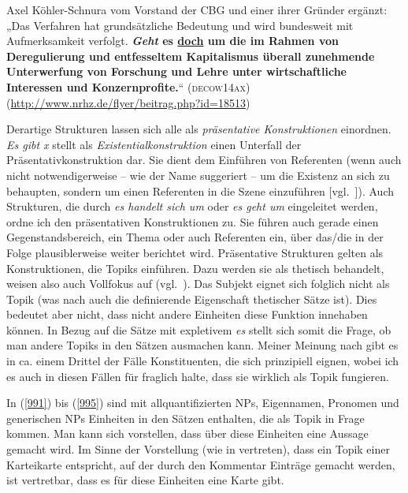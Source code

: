 {\begin{exe}
	Axel Köhler-Schnura vom Vorstand der CBG und einer ihrer Gründer ergänzt: „Das Verfahren hat grundsätzliche Bedeutung und wird bundesweit mit 			Aufmerksamkeit verfolgt. \textbf{\textit{Geht} es \ul{doch} um die im Rahmen von Deregulierung und entfesseltem Kapitalismus überall zunehmende 		Unterwerfung von Forschung und Lehre unter wirtschaftliche Interessen und Konzernprofite.}“
	\hfill\hbox{\scshape(decow14ax)}
	\newline
	{\scriptsize(\url{http://www.nrhz.de/flyer/beitrag.php?id=18513})}
\end{exe}						                                      
Derartige Strukturen lassen sich alle als \textit{präsentative Konstruktionen} einordnen. \textit{Es gibt x} stellt als \textit{Existentialkonstruktion} einen Unterfall der Präsentativkonstruktion dar. Sie dient dem Einführen von Referenten (wenn auch nicht notwendigerweise – wie der Name suggeriert – um die Existenz an sich zu behaupten, sondern um einen Referenten in die Szene einzuführen [vgl.\ \citealt[179]{Lambrecht1994}]). Auch Strukturen, die durch \textit{es handelt sich um} oder \textit{es geht um} eingeleitet werden, ordne ich den präsentativen Konstruktionen zu. Sie führen auch gerade einen Gegenstandsbereich, ein Thema oder auch Referenten ein, über das/die in der Folge plausiblerweise weiter berichtet wird. Präsentative Strukturen gelten als Konstruktionen, die Topiks einführen. Dazu werden sie als thetisch  behandelt, weisen also auch Vollfokus  auf (vgl.\ \citealt[144, 177]{Lambrecht1994}). Das Subjekt eignet sich folglich nicht als Topik (was nach \citealt[144--145]{Lambrecht1994} auch die definierende Eigenschaft thetischer Sätze ist). Dies bedeutet aber nicht, dass nicht andere Einheiten diese Funktion innehaben können. In Bezug auf die Sätze mit expletivem \textit{es} stellt sich somit die Frage, ob man andere Topiks in den Sätzen ausmachen kann. Meiner Meinung nach gibt es in ca. einem Drittel der Fälle Konstituenten, die sich prinzipiell eignen, wobei ich es auch in diesen Fällen für fraglich halte, dass sie wirklich als Topik fungieren.

In (\ref{991}) bis (\ref{995}) sind mit allquantifizierten NPs, Eigennamen, Pronomen und generischen NPs Einheiten in den Sätzen enthalten, die als Topik in Frage kommen. Man kann sich vorstellen, dass über diese Einheiten eine Aussage gemacht wird. Im Sinne der Vorstellung (wie in \citealt{Reinhart1981} vertreten), dass ein Topik einer Karteikarte entspricht, auf der durch den Kommentar Einträge gemacht werden, ist vertretbar, dass es für diese Einheiten eine Karte gibt.

}
